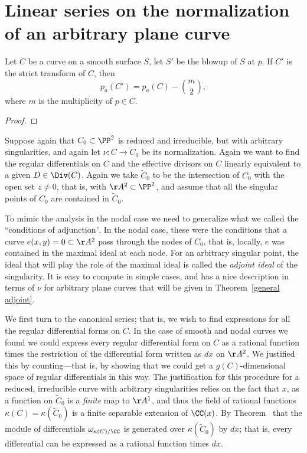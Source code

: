 \section{Linear series on the normalization of an arbitrary plane curve} \label{arbitrary plane curves}

\begin{proposition}\label{effect of blowup on genus}
 Let $C$ be a curve on a smooth surface $S$, let $S'$ be the blowup of $S$ at $p$. If $C'$ is the strict transform of $C$, then
 $$
 p_a(C') = p_a(C) -{m\choose 2},
 $$
 where $m$ is the multiplicity of $p\in C$.
\end{proposition}
\begin{proof}

\end{proof}
Suppose again that $C_0 \subset \PP^2$ is reduced and irreducible, but with arbitrary singularities, and again let $\nu : C \to C_0$ be its normalization. Again we want to find the regular differentials on $C$ and the effective divisors on $C$ linearly equivalent to a given $D \in \Div(C)$. Again we take $\widetilde C_0$ to be the intersection of $C_0$ with the open set $z \neq 0$, that is, with $\AA^2\subset \PP^2$, and assume that
all the singular points of $C_0$ are contained in $\widetilde C_0$.

To mimic the analysis in the nodal case we need to generalize what we called the ``conditions of adjunction''. In the nodal case, these were the conditions that a curve $e(x,y)=0 \subset \AA^2$ pass through the nodes of $C_0$, that is, locally, $e$ was contained in the maximal ideal
at each node. For an arbitrary singular point, the ideal that will play the role of the maximal ideal is called the \emph{adjoint ideal} of the singularity. It is easy to compute in simple cases, and has a nice description in terms of $\nu$ for arbitrary plane curves that will be given in Theorem~\ref{general adjoint}.

We first turn to the canonical series; that is, we wish to find expressions for all the regular differential forms on $C$. In the case of smooth and nodal curves we found we could express every regular differential form
on $C$ as a rational function times the restriction of the differential form written as $dx$ on $\AA^2$. We justified this
by counting---that is, by showing that we could get a $g(C)$-dimensional space of regular differentials in this way. The justification for 
this procedure for a reduced, irreducible curve with arbitrary singularities relies on the fact that $x$, as a function on $\widetilde C_0$
is a \emph{finite} map to $\AA^1$, and thus the field of rational functions $\kappa(C) = \kappa(\widetilde C_0)$ is a finite
separable extension of $\CC(x)$. By Theorem~\cite[****]{Eisenbud1995} that the module of differentials 
$\omega_{\kappa(C)/\CC}$ is generated over $\kappa(\widetilde C_0)$ by $dx$; that is, every differential can be expressed as a rational function
times $dx$. 

